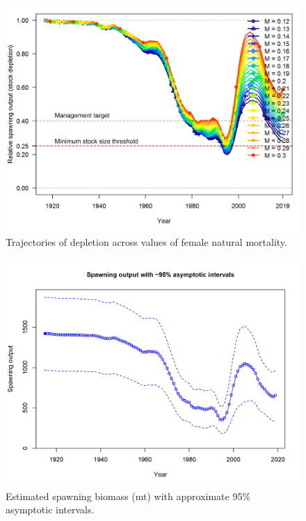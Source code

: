 \documentclass[12pt,]{article}
\begin{document}
\begin{figure}
\centering
\includegraphics{Figures/profile_m_depl.png}
\caption{Trajectories of depletion across values of female natural
mortality. \label{fig:profile_m_depl}}
\end{figure}

\FloatBarrier

\begin{figure}
\centering
\includegraphics{r4ss/plots_mod1/ts7_Spawning_output_with_95_asymptotic_intervals_intervals.png}
\caption{Estimated spawning biomass (mt) with approximate 95\%
asymptotic intervals.
\label{fig:ts7_Spawning_biomass_(mt)_with_95_asymptotic_intervals_intervals}}
\end{figure}
\end{document}
